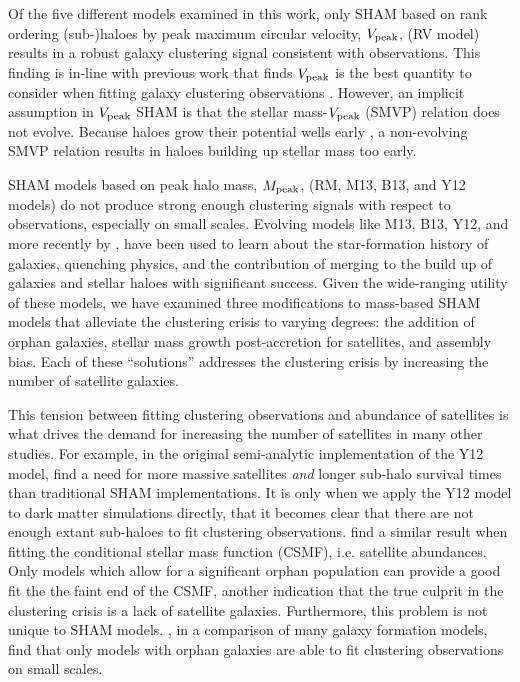 \documentclass[a4paper,fleqn,usenatbib]{mnras}
\begin{document}
Of the five different models examined in this work, only SHAM based on rank ordering (sub-)haloes by peak maximum circular velocity, $V_{\rm peak}$, (RV  model) results in a robust galaxy clustering signal consistent with observations.  This finding is in-line with previous work that finds $V_{\rm peak}$ is the best quantity to consider when fitting galaxy clustering observations \citep{Reddick:2013gi, Lehmann:2015vi}.  However, an implicit assumption in $V_{\rm peak}$ SHAM is that the stellar mass-$V_{\rm peak}$ (SMVP) relation does not evolve. Because haloes grow their potential wells early \citep[e.g.][]{Bosch:2014cu}, a non-evolving SMVP relation results in haloes building up stellar mass too early.  

SHAM models based on peak halo mass, $M_{\rm peak}$, (RM, M13, B13, and Y12 models) do not produce strong enough clustering signals with respect to observations, especially on small scales.  Evolving models like M13, B13, Y12, and more recently by \citet{RodriguezPuebla:2017uo}, have been used to learn about the star-formation history of galaxies, quenching physics, and the contribution of merging to the build up of galaxies and stellar haloes with significant success.  Given the wide-ranging utility of these models, we have examined three modifications to mass-based SHAM models that alleviate the clustering crisis to varying degrees: the addition of orphan galaxies, stellar mass growth post-accretion for satellites, and assembly bias.  Each of these ``solutions'' addresses the clustering crisis by increasing the number of satellite galaxies.

This tension between fitting clustering observations and abundance of satellites is what drives the demand for increasing the number of satellites in many other studies.  For example, in the original semi-analytic implementation of the Y12 model, \cite{Yang:2012ew} find a need for more massive satellites {\em and} longer sub-halo survival times than traditional SHAM implementations.  It is only when we apply the Y12 model to dark matter simulations directly, that it becomes clear that there are not enough extant sub-haloes to fit clustering observations.  \citet{Lim:2016ul} find a similar result when fitting the conditional stellar mass function (CSMF), i.e. satellite abundances.  Only models which allow for a significant orphan population can provide a good fit the the faint end of the CSMF, another indication that the true culprit in the clustering crisis is a lack of satellite galaxies.  Furthermore, this problem is not unique to SHAM models.  \cite{Pujol:2017ua}, in a comparison of many galaxy formation models, find that only models with orphan galaxies are able to fit clustering observations on small scales. 
\end{document}
